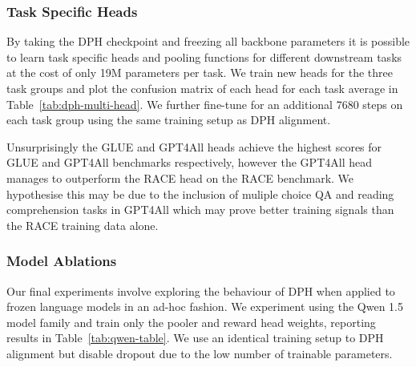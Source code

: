 \subsubsection{Task Specific Heads} \label{sec:task-specific}
By taking the DPH checkpoint and freezing all backbone parameters it is possible to learn task specific heads and pooling functions for different downstream tasks at the cost of only 19M parameters per task. We train new heads for the three task groups and plot the confusion matrix of each head for each task average in Table~\ref{tab:dph-multi-head}. We further fine-tune for an additional 7680 steps on each task group using the same training setup as DPH alignment.

\begingroup
\vspace{-9pt}
\setlength{\tabcolsep}{12pt}
\setlength{\extrarowheight}{3pt}
\begin{table}[ht]
\centering
\caption{Confusion matrix comparing validation scores for alternate heads.}
\label{tab:dph-multi-head}
\vspace*{-0.5\baselineskip}
\end{table}
\endgroup

Unsurprisingly the GLUE and GPT4All heads achieve the highest scores for GLUE and GPT4All benchmarks respectively, however the GPT4All head manages to outperform the RACE head on the RACE benchmark. We hypothesise this may be due to the inclusion of muliple choice QA and reading comprehension tasks in GPT4All which may prove better training signals than the RACE training data alone.

\subsubsection{Model Ablations}
Our final experiments involve exploring the behaviour of DPH when applied to frozen language models in an ad-hoc fashion. We experiment using the Qwen 1.5 model family \cite{qwen} and train only the pooler and reward head weights, reporting results in Table~\ref{tab:qwen-table}. We use an identical training setup to DPH alignment but disable dropout due to the low number of trainable parameters.

